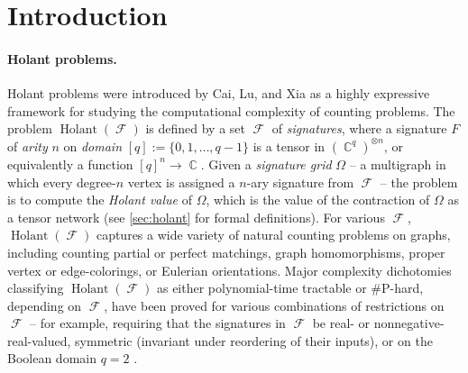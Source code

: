 \documentclass{article}
\DeclareMathOperator{\cc}{\mathbb{C}}
\DeclareMathOperator{\fc}{\mathcal{F}}
\DeclareMathOperator{\holant}{Holant}
\begin{document}
\section{Introduction}
\paragraph{Holant problems.}

Holant problems were introduced by Cai, Lu, and Xia \cite{cai_computational_2011} as a highly
expressive framework for studying the computational complexity of counting problems. 
The problem $\holant(\fc)$ is defined by a set $\fc$ of \emph{signatures}, 
where a signature $F$ of \emph{arity}
$n$ on \emph{domain} $[q] := \{0,1,\ldots,q-1\}$ is a tensor in $(\cc^q)^{\otimes n}$, or equivalently
a function $[q]^n \to \cc$.
Given a \emph{signature grid} $\Omega$ -- a multigraph in which every degree-$n$ vertex is assigned a
$n$-ary signature from $\fc$ --
the problem is to compute the \emph{Holant value} of $\Omega$, which is the value
of the contraction of $\Omega$ as a tensor network (see \autoref{sec:holant} for formal definitions). 
For various $\fc$, $\holant(\fc)$ captures a wide variety of natural counting problems on
graphs, including counting partial or perfect matchings, graph homomorphisms, 
proper vertex or edge-colorings, or Eulerian orientations.
Major complexity dichotomies classifying $\holant(\fc)$ as either 
polynomial-time tractable or \#P-hard,
depending on $\fc$, have been proved for various combinations of restrictions on $\fc$ -- for example,
requiring that the signatures in $\fc$ be real- or nonnegative-real-valued, symmetric
(invariant under reordering of their inputs), or on the Boolean domain $q=2$
\cite{huang_2016_dichotomy,cai_complete_2016,cai2015holant,lin_complexity_2018,shao}.
\end{document}
